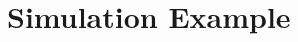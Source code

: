 \documentclass[journal,onecolumn]{IEEEtran}
\begin{document}

\section{Simulation Example}








\end{document}
